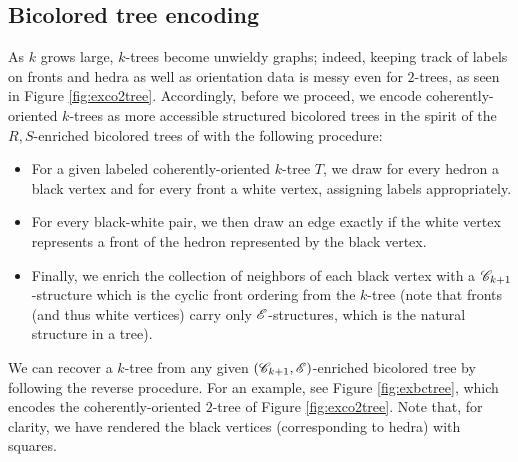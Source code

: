 \documentclass[sectionflow,singlespace,twoside]{brandiss} %
\numberwithin{section}{chapter}
\numberwithin{figure}{chapter}
\begin{document}
\subsection{Bicolored tree encoding}\label{ss:bctree}
As $k$ grows large, $k$-trees become unwieldy graphs; indeed, keeping track of labels on fronts and hedra as well as orientation data is messy even for $2$-trees, as seen in Figure \ref{fig:exco2tree}.
Accordingly, before we proceed, we encode coherently-oriented $k$-trees as more accessible structured bicolored trees in the spirit of the $R, S$-enriched bicolored trees of \cite[\S 3.2]{bll:species} with the following procedure:
\begin{itemize}
  \item For a given labeled coherently-oriented $k$-tree $T$, we draw for every hedron a black vertex and for every front a white vertex, assigning labels appropriately.
  \item For every black-white pair, we then draw an edge exactly if the white vertex represents a front of the hedron represented by the black vertex.
  \item Finally, we enrich the collection of neighbors of each black vertex with a $\mathscr{C}_{k+1}$-structure which is the cyclic front ordering from the $k$-tree (note that fronts (and thus white vertices) carry only $\mathscr{E}$-structures, which is the natural structure in a tree).
\end{itemize}
We can recover a $k$-tree from any given $\left( {\mathscr{C}_{k+1}, \mathscr{E}} \right)$-enriched bicolored tree by following the reverse procedure.
For an example, see Figure \ref{fig:exbctree}, which encodes the coherently-oriented $2$-tree of Figure \ref{fig:exco2tree}.
Note that, for clarity, we have rendered the black vertices (corresponding to hedra) with squares.
\end{document}
